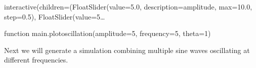 \documentclass[letterpaper,10pt,english]{sphinxmanual}
\begin{document}
\begin{sphinxVerbatim}[commandchars=\\\{\}]
    
             
            
\end{sphinxVerbatim}

\begin{sphinxVerbatim}[commandchars=\\\{\}]
interactive(children=(FloatSlider(value=5.0, description=\PYGZsq{}amplitude\PYGZsq{}, max=10.0, step=0.5), FloatSlider(value=5…
\end{sphinxVerbatim}

\begin{sphinxVerbatim}[commandchars=\\\{\}]
\PYGZlt{}function \PYGZus{}\PYGZus{}main\PYGZus{}\PYGZus{}.plot\PYGZus{}oscillation(amplitude=5, frequency=5, theta=1)\PYGZgt{}
\end{sphinxVerbatim}

Next we will generate a simulation combining multiple sine waves oscillating at different frequencies.
\end{document}
